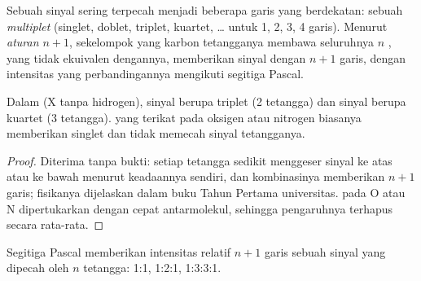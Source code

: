\begin{definition}\label{def:g12:proton-nmr:multiplet}
Sebuah sinyal sering terpecah menjadi beberapa garis yang berdekatan:
sebuah \emph{multiplet} (singlet, doblet, triplet,
kuartet, \dots{} untuk 1, 2, 3, 4 garis). Menurut
\emph{aturan $n+1$}, sekelompok  yang  karbon tetangganya membawa seluruhnya $n$
, yang tidak ekuivalen dengannya, memberikan sinyal dengan $n+1$
garis, dengan intensitas yang perbandingannya mengikuti segitiga Pascal.
\end{definition}

\begin{proposition}\label{prop:g12:proton-nmr:n-plus-one}
Dalam   (X tanpa hidrogen), sinyal  berupa
triplet (2  tetangga) dan sinyal  berupa kuartet (3 
tetangga).  yang terikat pada  oksigen atau nitrogen biasanya
memberikan singlet dan tidak memecah sinyal tetangganya.
\end{proposition}

\begin{proof}
Diterima tanpa bukti: setiap  tetangga sedikit menggeser sinyal ke
atas atau ke bawah menurut keadaannya sendiri, dan kombinasinya
memberikan $n+1$ garis; fisikanya dijelaskan dalam buku Tahun Pertama
universitas.  pada O atau N dipertukarkan dengan cepat antarmolekul,
sehingga pengaruhnya terhapus secara rata-rata.
\end{proof}

\begin{omfigure}

{\small Segitiga Pascal memberikan intensitas relatif $n+1$ garis sebuah
sinyal yang dipecah oleh $n$  tetangga: 1:1, 1:2:1, 1:3:3:1.}
\end{omfigure}


